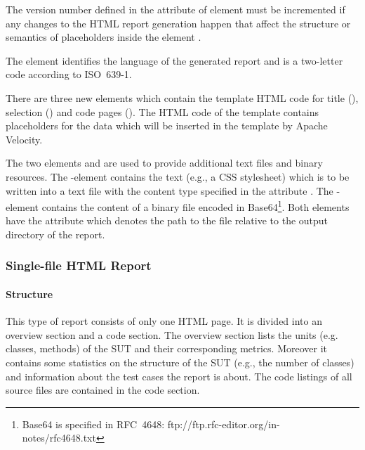 The version number defined in the attribute  of element  must be incremented if any changes to the HTML report generation happen that affect the structure or semantics of placeholders inside the element .

The element  identifies the language of the generated report and is a two-letter code according to ISO~639-1.

There are three new elements which contain the template HTML code for title (), selection () and code pages (). The HTML code of the template contains placeholders for the data which will be inserted in the template by Apache Velocity.

The two elements  and  are used to provide additional text files and binary resources. The -element contains the text (e.g., a CSS stylesheet) which is to be written into a text file with the content type specified in the attribute . The -element contains the content of a binary file encoded in Base64\footnote{Base64 is specified in RFC~4648: ftp://ftp.rfc-editor.org/in-notes/rfc4648.txt}. Both elements have the attribute  which denotes the path to the file relative to the output directory of the report.

\subsubsection{Single-file HTML Report} \label{Components:Report:HTML_singlefile}

\paragraph{Structure}

This type of report consists of only one HTML page. It is divided into an overview section and a code section. The overview section lists the units (e.g. classes, methods) of the SUT and their corresponding metrics. Moreover it contains some statistics on the structure of the SUT (e.g., the number of classes) and information about the test cases the report is about.  The code listings of all source files are contained in the code section. 

